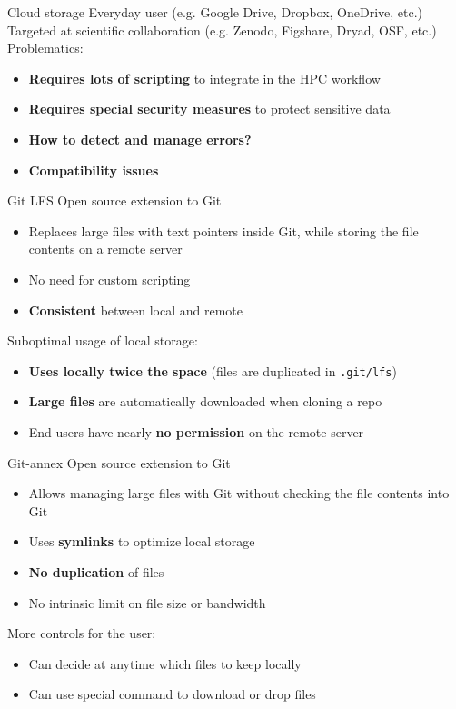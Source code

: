 \begin{frame}{Cloud storage}
  Everyday user (e.g. Google Drive, Dropbox, OneDrive, etc.) \\
  Targeted at scientific collaboration (e.g. Zenodo, Figshare, Dryad, OSF, etc.)\\
  Problematics:
  \begin{itemize}
    \item \textbf{Requires lots of scripting} to integrate in the HPC workflow
    \item \textbf{Requires special security measures} to protect sensitive data
    \item \textbf{How to detect and manage errors?}
    \item \textbf{Compatibility issues}
  \end{itemize}
\end{frame}

\begin{frame}{Git LFS}
  Open source extension to Git
  \begin{itemize}
    \item Replaces large files with text pointers inside Git, while storing the file contents on a remote server
    \item No need for custom scripting
    \item \textbf{Consistent} between local and remote
  \end{itemize}
  Suboptimal usage of local storage:
  \begin{itemize}
    \item \textbf{Uses locally twice the space} (files are duplicated in \texttt{.git/lfs})
    \item \textbf{Large files} are automatically downloaded when cloning a repo
    \item End users have nearly \textbf{no permission} on the remote server
  \end{itemize}
\end{frame}

\begin{frame}{Git-annex}
  Open source extension to Git
  \begin{itemize}
    \item Allows managing large files with Git without checking the file contents into Git
    \item Uses \textbf{symlinks} to optimize local storage
    \item \textbf{No duplication} of files
    \item No intrinsic limit on file size or bandwidth
  \end{itemize}
  More controls for the user:
  \begin{itemize}
    \item Can decide at anytime which files to keep locally
    \item Can use special command to download or drop files
  \end{itemize}
\end{frame}

